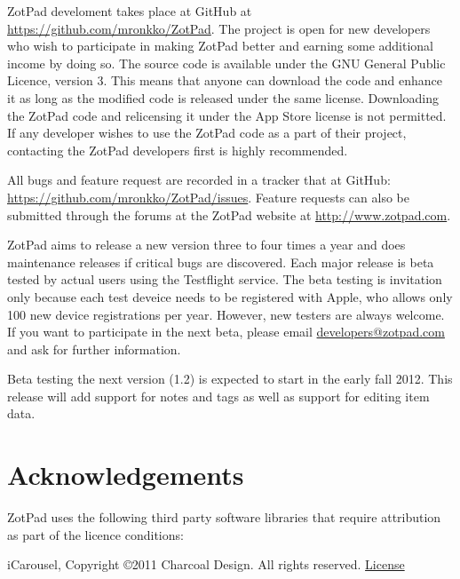 \documentclass[oneside, openany, 12pt]{tufte-book}
\newcommand{\ipad}[1]{}
\newcommand{\ipad}[1]{#1}
\begin{document}
ZotPad develoment takes place at GitHub at \url{https://github.com/mronkko/ZotPad}. The project is open for new developers who wish to participate in making ZotPad better and earning some additional income by doing so. The source code is available under the GNU General Public Licence, version 3. This means that anyone can download the code and enhance it as long as the modified code is released under the same license. Downloading the ZotPad code and relicensing it under the App Store license is not permitted. If any developer wishes to use the ZotPad code as a part of their project, contacting the ZotPad developers first is highly recommended.

All bugs and feature request are recorded in a tracker that at GitHub: \url{https://github.com/mronkko/ZotPad/issues}. Feature requests can also be submitted through the forums at the ZotPad website at \url{http://www.zotpad.com}. 

ZotPad aims to release a new version three to four times a year and does maintenance releases if critical bugs are discovered. Each major release is beta tested by actual users using the Testflight service. The beta testing is invitation only because each test deveice needs to be registered with Apple, who allows only 100 new device registrations per year. However, new testers are always welcome. If you want to participate in the next beta, please email \href{mailto:developers@zotpad.com}{developers@zotpad.com} and ask for further information.

Beta testing the next version (1.2) is expected to start in the early fall 2012. This release will add support for notes and tags as well as support for editing item data. 

\chapter{Acknowledgements}

\ipad{\begin{fullwidth}}

\setlength{\parindent}{0pt}

\setlength{\parskip}{\baselineskip}

ZotPad uses the following third party software libraries that require attribution as part of the licence conditions:

iCarousel, Copyright \copyright 2011 Charcoal Design. All rights reserved. \href{https://raw.github.com/nicklockwood/iCarousel/104d499da7b107b8baa58ab85c6d0f44d504e957/LICENCE.md}{License}
\end{document}
